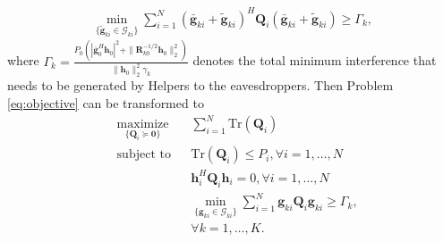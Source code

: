 \documentclass[journal]{IEEEtran}
\begin{document}
\begin{eqnarray} \label{eq:sum_noise}
\min_{\{\tilde{\mathbf{g}}_{ki} \in \mathcal{G}_{ki} \}}\sum_{i=1}^{N}(\bar{\mathbf{g}}_{ki}+\tilde{\mathbf{g}}_{ki})^H\mathbf{Q}_i(\bar{\mathbf{g}}_{ki}+\tilde{\mathbf{g}}_{ki}) \geq \Gamma_k  \label{eq:artificial noise constraint},
\end{eqnarray}
where $\Gamma_k =\frac{P_0\left(|\bar{\mathbf{g}}_0^H\mathbf{h}_0|^2 + \|\mathbf{R}_{k0}^{-1/2}\mathbf{h}_0\|_2^2\right)}{\|\mathbf{h}_0\|_2^2\gamma_k}$ denotes the total minimum interference that needs to be generated by Helpers to the eavesdroppers. Then Problem \eqref{eq:objective} can be transformed to 
\begin{equation}
\begin{aligned} \label{eq:central_problem1}
& \underset{\{\mathbf{Q}_i \succeq \mathbf{0}\}}{\text{maximize}}
& & \sum_{i = 1}^{N}\mathrm{Tr}(\mathbf{Q}_i) \\
& \text{subject to}
& & \mathrm{Tr}(\mathbf{Q}_i) \leq P_i, \forall i = 1, \ldots, N\\
&&& \mathbf{h}_i^H \mathbf{Q}_i \mathbf{h}_i= 0, \forall i = 1,\ldots,N\\
&&& \min_{\{\mathbf{g}_{ki} \in \mathcal{G}_{ki} \}}\sum_{i=1}^{N}\mathbf{g}_{ki}\mathbf{Q}_i\mathbf{g}_{ki} \geq  \Gamma_k,\\
&&& \forall k = 1, \ldots, K.
\end{aligned}
\end{equation}
\end{document}
